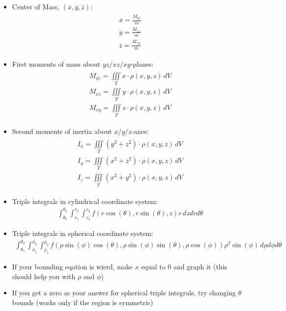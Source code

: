 \documentclass{article}
\begin{document}
\begin{itemize}
\begin{itemize}
  \end{itemize}
  \item Center of Mass, $(\overline{x}, \overline{y}, \overline{z})$:
  \begin{align}
    \begin{split}
      \overline{x} = \frac{M_{yz}}{m} \\
      \overline{y} = \frac{M_{xz}}{m} \\
      \overline{z} = \frac{M_{xy}}{m}
    \end{split}
  \end{align}
  \item First moments of mass about $yz/xz/xy$-planes:
  \begin{align}
    \begin{split}
      M_{yz} = \iiint\limits_T x\cdot\rho(x,y,z) \, dV \\
      M_{xz} = \iiint\limits_T y\cdot\rho(x,y,z) \, dV \\
      M_{xy} = \iiint\limits_T z\cdot\rho(x,y,z) \, dV
    \end{split}
  \end{align}
  \item Second moments of inertia about $x/y/z$-axes:
  \begin{align}
    \begin{split}
      I_x = \iiint\limits_T (y^2 + z^2)\cdot\rho(x,y,z) \, dV \\
      I_y = \iiint\limits_T (x^2 + z^2)\cdot\rho(x,y,z) \, dV \\
      I_z = \iiint\limits_T (x^2 + y^2)\cdot\rho(x,y,z) \, dV
    \end{split}
  \end{align}
  \item Triple integrals in cylindrical coordinate system:
  \begin{align}
    \int_{\theta_1}^{\theta_2}\int_{r_1}^{r_2}\int_{z_1}^{z_2} f(r\cos(\theta), r\sin(\theta), z)r \, dzdrd\theta
  \end{align}
  \item Triple integrals in spherical coordinate system:
  \begin{align}
    \int_{\theta_1}^{\theta_2}\int_{\phi_1}^{\phi_2}\int_{\rho_1}^{\rho_2} f(\rho\sin(\phi)\cos(\theta), \rho\sin(\phi)\sin(\theta), \rho\cos(\phi))\rho^2\sin(\phi) \, d\rho d\phi d\theta
  \end{align}
  \item If your bounding eqation is wierd, make $x$ equal to 0 and graph it (this should help you with $\rho$ and $\phi$)
  \item If you get a zero as your answer for spherical triple integrals, try changing $\theta$ bounds (works only if the region is symmetric)
\end{itemize}
\end{document}
